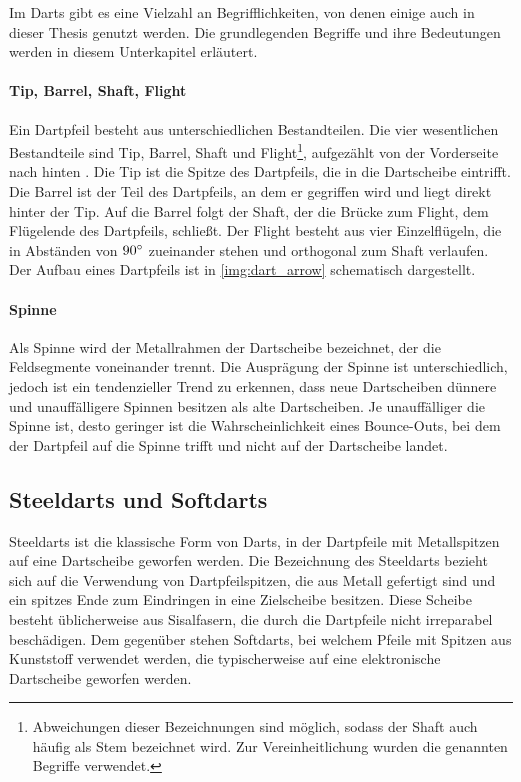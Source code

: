 Im Darts gibt es eine Vielzahl an Begrifflichkeiten, von denen einige auch in dieser Thesis genutzt werden. Die grundlegenden Begriffe und ihre Bedeutungen werden in diesem Unterkapitel erläutert.

\paragraph{Tip, Barrel, Shaft, Flight}

Ein Dartpfeil besteht aus unterschiedlichen Bestandteilen. Die vier wesentlichen Bestandteile sind Tip, Barrel, Shaft und Flight\footnote{Abweichungen dieser Bezeichnungen sind möglich, sodass der Shaft auch häufig als Stem bezeichnet wird. Zur Vereinheitlichung wurden die genannten Begriffe verwendet.}, aufgezählt von der Vorderseite nach hinten \cite{wdf-rules,pdc_rules}. Die Tip ist die Spitze des Dartpfeils, die in die Dartscheibe eintrifft. Die Barrel ist der Teil des Dartpfeils, an dem er gegriffen wird und liegt direkt hinter der Tip. Auf die Barrel folgt der Shaft, der die Brücke zum Flight, dem Flügelende des Dartpfeils, schließt. Der Flight besteht aus vier Einzelflügeln, die in Abständen von $90^{\circ}$ zueinander stehen und orthogonal zum Shaft verlaufen. Der Aufbau eines Dartpfeils ist in \autoref{img:dart_arrow} schematisch dargestellt.

\paragraph{Spinne}

Als Spinne wird der Metallrahmen der Dartscheibe bezeichnet, der die Feldsegmente voneinander trennt. Die Ausprägung der Spinne ist unterschiedlich, jedoch ist ein tendenzieller Trend zu erkennen, dass neue Dartscheiben dünnere und unauffälligere Spinnen besitzen als alte Dartscheiben. Je unauffälliger die Spinne ist, desto geringer ist die Wahrscheinlichkeit eines Bounce-Outs, bei dem der Dartpfeil auf die Spinne trifft und nicht auf der Dartscheibe landet.


\subsection{Steeldarts und Softdarts}
\label{sec:steeldarts}

Steeldarts ist die klassische Form von Darts, in der Dartpfeile mit Metallspitzen auf eine Dartscheibe geworfen werden. Die Bezeichnung des Steeldarts bezieht sich auf die Verwendung von Dartpfeilspitzen, die aus Metall gefertigt sind und ein spitzes Ende zum Eindringen in eine Zielscheibe besitzen. Diese Scheibe besteht üblicherweise aus Sisalfasern, die durch die Dartpfeile nicht irreparabel beschädigen. Dem gegenüber stehen Softdarts, bei welchem Pfeile mit Spitzen aus Kunststoff verwendet werden, die typischerweise auf eine elektronische Dartscheibe geworfen werden.

